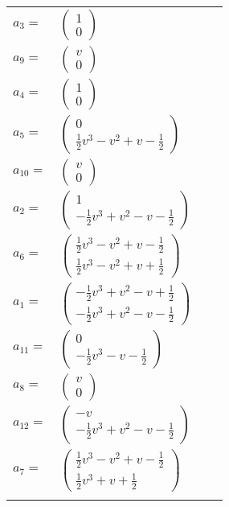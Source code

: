 \documentclass[1p]{elsarticle_modified}
\theoremstyle{definition}
\begin{document}
\begin{tabular}{m{7pt} m{180pt} m{7pt} m{180pt} }
\flushright $a_{3}=$&$\begin{pmatrix}1\\0\end{pmatrix}$ \\
\flushright $a_{9}=$&$\begin{pmatrix}v\\0\end{pmatrix}$ \\
\flushright $a_{4}=$&$\begin{pmatrix}1\\0\end{pmatrix}$ \\
\flushright $a_{5}=$&$\begin{pmatrix}0\\\frac{1}{2} v^3- v^2+v-\frac{1}{2}\end{pmatrix}$ \\
\flushright $a_{10}=$&$\begin{pmatrix}v\\0\end{pmatrix}$ \\
\flushright $a_{2}=$&$\begin{pmatrix}1\\-\frac{1}{2} v^3+v^2- v-\frac{1}{2}\end{pmatrix}$ \\
\flushright $a_{6}=$&$\begin{pmatrix}\frac{1}{2} v^3- v^2+v-\frac{1}{2}\\\frac{1}{2} v^3- v^2+v+\frac{1}{2}\end{pmatrix}$ \\
\flushright $a_{1}=$&$\begin{pmatrix}-\frac{1}{2} v^3+v^2- v+\frac{1}{2}\\-\frac{1}{2} v^3+v^2- v-\frac{1}{2}\end{pmatrix}$ \\
\flushright $a_{11}=$&$\begin{pmatrix}0\\-\frac{1}{2} v^3- v-\frac{1}{2}\end{pmatrix}$ \\
\flushright $a_{8}=$&$\begin{pmatrix}v\\0\end{pmatrix}$ \\
\flushright $a_{12}=$&$\begin{pmatrix}- v\\-\frac{1}{2} v^3+v^2- v-\frac{1}{2}\end{pmatrix}$ \\
\flushright $a_{7}=$&$\begin{pmatrix}\frac{1}{2} v^3- v^2+v-\frac{1}{2}\\\frac{1}{2} v^3+v+\frac{1}{2}\end{pmatrix}$\\&\end{tabular}
\end{document}

